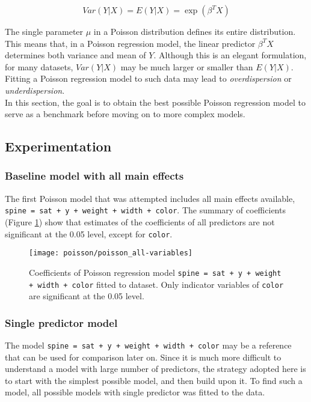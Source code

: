 \documentclass[a4paper, 12pt]{article}
\begin{document}
$$ Var(Y|X) = E(Y|X) = \exp(\beta^TX)$$

\noindent The single parameter $\mu$ in a Poisson distribution defines its entire distribution. This means that, in a Poisson regression model, the linear predictor $\beta^TX$ determines both variance and mean of $Y$. Although this is an elegant formulation, for many datasets, $Var(Y|X)$ may be much larger or smaller than $E(Y|X)$. Fitting a Poisson regression model to such data may lead to \textit{overdispersion} or \textit{underdispersion}. \\
\indent In this section, the goal is to obtain the best possible Poisson regression model to serve as a benchmark before moving on to more complex models.

\subsection{Experimentation}
\subsubsection{Baseline model with all main effects}
The first Poisson model that was attempted includes all main effects available, \texttt{spine = sat + y + weight + width + color}. The summary of coefficients (Figure \ref{poisson_all-variables}) show that estimates of the coefficients of all predictors are not significant at the 0.05 level, except for \texttt{color}. 

\begin{figure}[H]
\begin{center}
\texttt{[image: poisson/poisson\_all-variables]}
\caption{Coefficients of Poisson regression model \texttt{spine = sat + y + weight + width + color}  fitted to dataset. Only indicator variables of \texttt{color} are significant at the 0.05 level.  
}
\label{poisson_all-variables}
\end{center}
\end{figure}

\subsubsection{Single predictor model}
The model \texttt{spine = sat + y + weight + width + color} may be a reference that can be used for comparison later on. Since it is much more difficult to understand a model with large number of predictors, the strategy adopted here is to start with the simplest possible model, and then build upon it. To find such a model, all possible models with single predictor was fitted to the data.     
\end{document}
